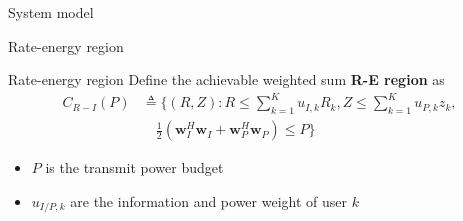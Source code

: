 \documentclass[9pt]{beamer}
\begin{document}
\begin{section}{System model}
	\begin{subsection}{Rate-energy region}
		\begin{frame}{Rate-energy region}
			Define the achievable weighted sum \textbf{R-E region} as
			\begin{equation}
				\begin{split}
					C_{R-I}(P)
					&\triangleq \biggl\{(R,Z):R\le\sum_{k=1}^K{u_{I,k}R_k},Z\le\sum_{k=1}^K u_{P,k}z_k,\\
					&\quad \frac{1}{2}({\boldsymbol{w}_I^H}{\boldsymbol{w}_I}+{\boldsymbol{w}_P^H}{\boldsymbol{w}_P}) \le P\biggr\}
				\end{split}
			\end{equation}
			\begin{itemize}
				\item $P$ is the transmit power budget
				\item $u_{I/P,k}$ are the information and power weight of user $k$
			\end{itemize}
		\end{frame}
	\end{subsection}
\end{section}
\end{document}
